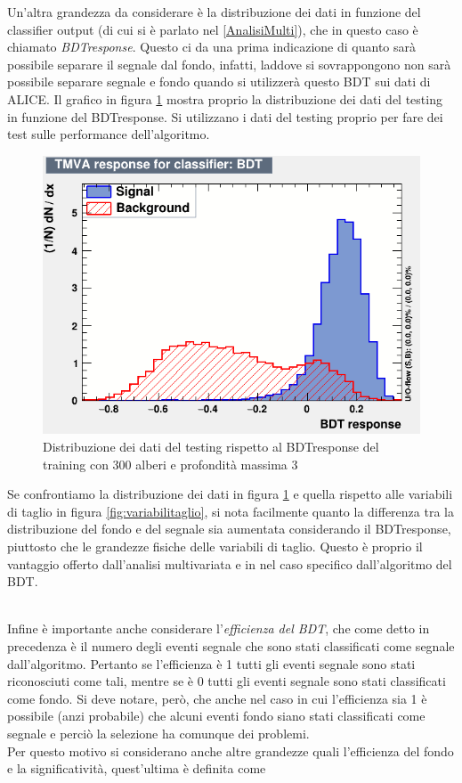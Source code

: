 Un'altra grandezza da considerare è la distribuzione dei dati in funzione del classifier output (di cui si è parlato nel \ref{AnalisiMulti}), che in questo caso è chiamato \textit{BDTresponse}. Questo ci da una prima indicazione di quanto sarà possibile separare il segnale dal fondo, infatti, laddove si sovrappongono non sarà possibile separare segnale e fondo quando si utilizzerà questo BDT sui dati di ALICE. Il grafico in figura \ref{fig:BDTresponse} mostra proprio la distribuzione dei dati del testing in funzione del BDTresponse. Si utilizzano i dati del testing proprio per fare dei test sulle performance dell'algoritmo. 

    \begin{figure}[htbp] 
        \centering
        \includegraphics[width=0.7\linewidth]{training&testing/BDTresponsetest.png}
        \caption{Distribuzione dei dati del testing rispetto al BDTresponse del training con 300 alberi e profondità massima 3}
        \label{fig:BDTresponse}
    \end{figure}
    
Se confrontiamo la distribuzione dei dati in figura \ref{fig:BDTresponse} e quella rispetto alle variabili di taglio in figura \ref{fig:variabilitaglio}, si nota facilmente quanto la differenza tra la distribuzione del fondo e del segnale sia aumentata considerando il BDTresponse, piuttosto che le grandezze fisiche delle variabili di taglio. Questo è proprio il vantaggio offerto dall'analisi multivariata e in nel caso specifico dall'algoritmo del BDT.
    
\\Infine è importante anche considerare l'\textit{efficienza del BDT}, che come detto in precedenza è il numero degli eventi segnale che sono stati classificati come segnale dall'algoritmo. Pertanto se l'efficienza è 1 tutti gli eventi segnale sono stati riconosciuti come tali, mentre se è 0 tutti gli eventi segnale sono stati classificati come fondo. Si deve notare, però, che anche nel caso in cui  l'efficienza sia 1 è possibile (anzi probabile) che alcuni eventi fondo siano stati classificati come segnale e perciò la selezione ha comunque dei problemi.
\\Per questo motivo si considerano anche altre grandezze quali l'efficienza del fondo e la significatività, quest'ultima è definita come 

